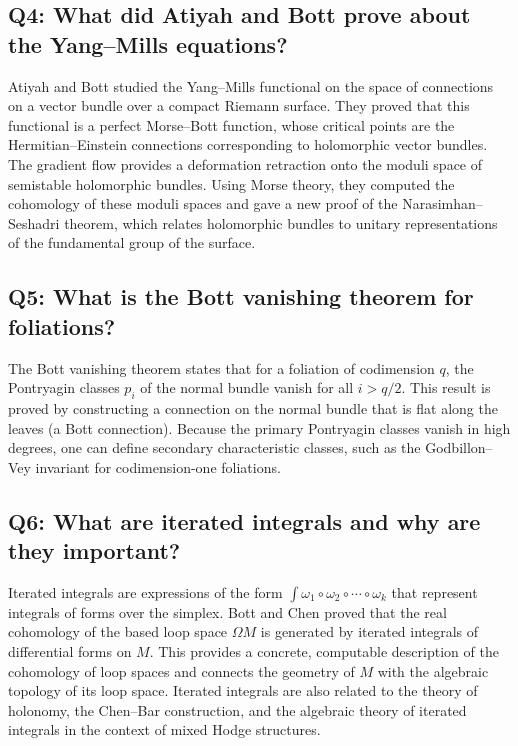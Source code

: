\subsection*{Q4: What did Atiyah and Bott prove about the Yang--Mills equations?}

Atiyah and Bott studied the Yang--Mills functional on the space of connections on a vector bundle over a compact Riemann surface. They proved that this functional is a perfect Morse--Bott function, whose critical points are the Hermitian--Einstein connections corresponding to holomorphic vector bundles. The gradient flow provides a deformation retraction onto the moduli space of semistable holomorphic bundles. Using Morse theory, they computed the cohomology of these moduli spaces and gave a new proof of the Narasimhan--Seshadri theorem, which relates holomorphic bundles to unitary representations of the fundamental group of the surface.

\subsection*{Q5: What is the Bott vanishing theorem for foliations?}

The Bott vanishing theorem states that for a foliation of codimension \(q\), the Pontryagin classes \(p_i\) of the normal bundle vanish for all \(i > q/2\). This result is proved by constructing a connection on the normal bundle that is flat along the leaves (a Bott connection). Because the primary Pontryagin classes vanish in high degrees, one can define secondary characteristic classes, such as the Godbillon--Vey invariant for codimension-one foliations.

\subsection*{Q6: What are iterated integrals and why are they important?}

Iterated integrals are expressions of the form \(\int \omega_1 \circ \omega_2 \circ \cdots \circ \omega_k\) that represent integrals of forms over the simplex. Bott and Chen proved that the real cohomology of the based loop space \(\Omega M\) is generated by iterated integrals of differential forms on \(M\). This provides a concrete, computable description of the cohomology of loop spaces and connects the geometry of \(M\) with the algebraic topology of its loop space. Iterated integrals are also related to the theory of holonomy, the Chen--Bar construction, and the algebraic theory of iterated integrals in the context of mixed Hodge structures.

